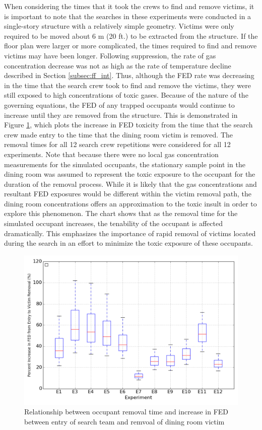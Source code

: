 \documentclass[12pt,oneside]{article}
\begin{document}
When considering the times that it took the crews to find and remove victims, it is important to note that the searches in these experiments were conducted in a single-story structure with a relatively simple geometry. Victims were only required to be moved about 6 m (20 ft.) to be extracted from the structure. If the floor plan were larger or more complicated, the times required to find and remove victims may have been longer. Following suppression, the rate of gas concentration decrease was not as high as the rate of temperature decline described in Section \ref{subsec:ff_int}. Thus, although the FED rate was decreasing in the time that the search crew took to find and remove the victims, they were still exposed to high concentrations of toxic gases. Because of the nature of the governing equations, the FED of any trapped occupants would continue to increase until they are removed from the structure. This is demonstrated in Figure \ref{fig:vic_removal}, which plots the increase in FED toxicity from the time that the search crew made entry to the time that the dining room victim is removed. The removal times for all 12 search crew repetitions were considered for all 12 experiments. Note that because there were no local gas concentration measurements for the simulated occupants, the stationary sample point in the dining room was assumed to represent the toxic exposure to the occupant for the duration of the removal process. While it is likely that the gas concentrations and resultant FED exposures would be different within the victim removal path, the dining room concentrations offers an approximation to the toxic insult in order to explore this phenomenon. The chart shows that as the removal time for the simulated occupant increases, the tenability of the occupant is affected dramatically. This emphasizes the importance of rapid removal of victims located during the search in an effort to minimize the toxic exposure of these occupants. 

\begin{figure}[!ht]
	\centering
	\includegraphics[width=.75\textwidth]{../Figures/victim_removal/V1}
	\caption[Relationship between occupant removal time and increase in FED between entry of search team and removal of dining room victim]{Relationship between occupant removal time and increase in FED between entry of search team and remvoal of dining room victim}
	\label{fig:vic_removal}
\end{figure}
\end{document}
